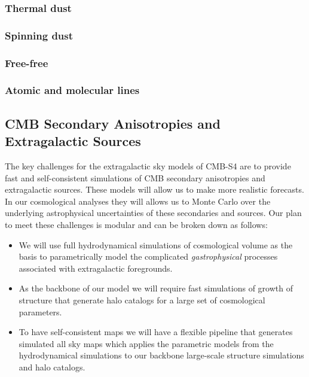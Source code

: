 \subsubsection{Thermal dust}

\subsubsection{Spinning dust}

\subsubsection{Free-free}

\subsubsection{Atomic and molecular lines}

\subsection{CMB Secondary Anisotropies and Extragalactic Sources}

The key challenges for the extragalactic sky models of CMB-S4 are to provide fast and self-consistent simulations of CMB secondary anisotropies and extragalactic sources. These models will allow us to make more realistic forecasts. In our cosmological analyses they will allows us to Monte Carlo over the underlying astrophysical uncertainties of these secondaries and sources. Our plan to meet these challenges is modular and can be broken down as follows: 

\begin{itemize}
\item We will use full hydrodynamical simulations of cosmological volume as the basis to parametrically model the complicated {\it gastrophysical} processes associated with extragalactic foregrounds.
\item As the backbone of our model we will require fast simulations of growth of structure that generate halo catalogs for a large set of cosmological parameters.
\item To have self-consistent maps we will have a flexible pipeline that generates simulated all sky maps which applies the parametric models from the hydrodynamical simulations to our backbone large-scale structure simulations and halo catalogs.
\end{itemize}

